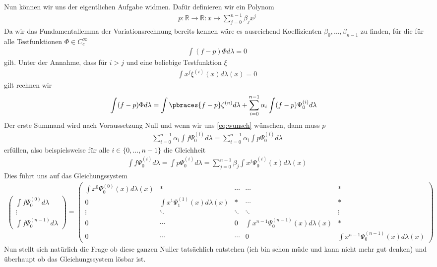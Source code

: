 \begin{solution}
    Nun können wir uns der eigentlichen Aufgabe widmen. Dafür definieren wir ein Polynom 
    \begin{align*}
        p:\mathbb{R}\to\mathbb{R}:x\mapsto\sum_{j=0}^{n-1}\beta_jx^j
    \end{align*}
    Da wir das Fundamentallemma der Variationsrechnung bereits kennen wäre es ausreichend Koeffizienten $\beta_0,\dots,\beta_{n-1}$ zu finden, für die für alle Testfunktionen $\Phi\in C_c^\infty$
    \begin{align}
        \int (f-p)\Phi d\lambda=0\label{eq:wunsch}
    \end{align}
    gilt. Unter der Annahme, dass für $i>j$ und eine beliebige Testfunktion $\xi$
    \begin{align*}
        \int x^j\xi^{(i)}(x)d\lambda(x) = 0
    \end{align*}
    gilt rechnen wir
    \begin{align*}
        \int (f-p)\Phi d\lambda&=\int\pbraces{f-p}\zeta^{(n)}d\lambda+\sum_{i=0}^{n-1}\alpha_i\int(f-p)\Psi_0^{(i)}d\lambda
    \end{align*}
    Der erste Summand wird nach Voraussetzung Null und wenn wir uns \eqref{eq:wunsch} wünschen, dann muss $p$
    \begin{align*}
        \sum_{i=0}^{n-1}\alpha_i\int f\Psi_0^{(i)}d\lambda=\sum_{i=0}^{n-1}\alpha_i\int p\Psi_0^{(i)}d\lambda
    \end{align*}
    erfüllen, also beispielsweise für alle $i\in\{0,\dots,n-1\}$ die Gleichheit
    \begin{align*}
        \int f\Psi_0^{(i)}d\lambda=\int p\Psi_0^{(i)}d\lambda=\sum_{j=0}^{n-1}\beta_j\int x^j\Psi_0^{(i)}(x)d\lambda(x)
    \end{align*} 
    Dies führt uns auf das Gleichungssystem
    \begin{align*}
        \begin{pmatrix}
            \int f\Psi_0^{(0)}d\lambda\\
            \vdots\\
            \int f\Psi_0^{(n-1)}d\lambda
        \end{pmatrix} 
        =
        \begin{pmatrix}
            \int x^0\Psi_0^{(0)}(x)d\lambda(x) & * & \cdots & \cdots & * \\
            0 & \int x^1\Psi_1^{(1)}(x)d\lambda(x) & * & \cdots & * \\
            \vdots & \ddots & \ddots & \ddots &\vdots \\
            0 & \cdots &  0 & \int x^{n-1}\Psi_0^{(n-1)}(x)d\lambda(x) & * \\
            0 & \cdots & \cdots & 0 & \int x^{n-1}\Psi_0^{(n-1)}(x)d\lambda(x)
        \end{pmatrix}
    \end{align*}
    Nun stellt sich natürlich die Frage ob diese ganzen Nuller tatsächlich entstehen (ich bin schon müde und kann nicht mehr gut denken) und überhaupt ob das Gleichungssystem lösbar ist.
\end{solution}
